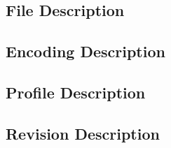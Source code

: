 








\subsection{File Description}


\subsection{Encoding Description}


\subsection{Profile Description}


\subsection{Revision Description}
